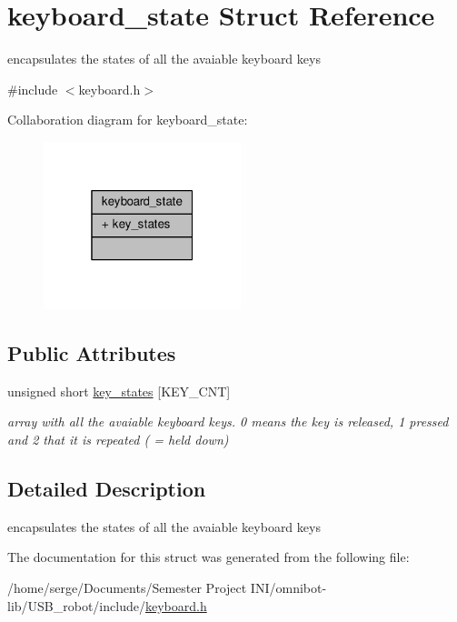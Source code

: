 \hypertarget{structkeyboard__state}{}\section{keyboard\+\_\+state Struct Reference}
\label{structkeyboard__state}


encapsulates the states of all the avaiable keyboard keys  




{\ttfamily \#include $<$keyboard.\+h$>$}



Collaboration diagram for keyboard\+\_\+state\+:
\nopagebreak
\begin{figure}[H]
\begin{center}
\leavevmode
\includegraphics[width=163pt]{structkeyboard__state__coll__graph}
\end{center}
\end{figure}
\subsection*{Public Attributes}
\begin{DoxyCompactItemize}
\item 
\hypertarget{structkeyboard__state_a185511b91db240cbfe49dbe92d5e88cb}{}unsigned short \hyperlink{structkeyboard__state_a185511b91db240cbfe49dbe92d5e88cb}{key\+\_\+states} \mbox{[}K\+E\+Y\+\_\+\+C\+N\+T\mbox{]}\label{structkeyboard__state_a185511b91db240cbfe49dbe92d5e88cb}

\begin{DoxyCompactList}\small\item\em array with all the avaiable keyboard keys. 0 means the key is released, 1 pressed and 2 that it is repeated ( = held down) \end{DoxyCompactList}\end{DoxyCompactItemize}


\subsection{Detailed Description}
encapsulates the states of all the avaiable keyboard keys 

The documentation for this struct was generated from the following file\+:\begin{DoxyCompactItemize}
\item 
/home/serge/\+Documents/\+Semester Project I\+N\+I/omnibot-\/lib/\+U\+S\+B\+\_\+robot/include/\hyperlink{keyboard_8h}{keyboard.\+h}\end{DoxyCompactItemize}
